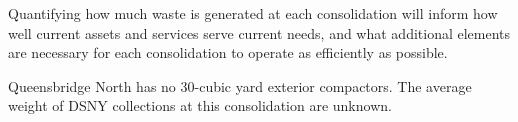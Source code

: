 
    Quantifying how much waste is generated at each consolidation will inform how well current assets and services serve current needs, and what additional elements are necessary for each consolidation to operate as efficiently as possible.
    
    Queensbridge North has no 30-cubic yard exterior compactors. The average weight of DSNY collections at this consolidation are unknown.
